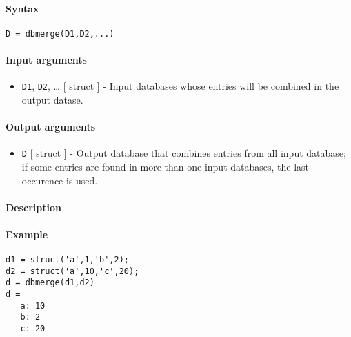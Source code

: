 


	\paragraph{Syntax}\label{syntax}

\begin{verbatim}
D = dbmerge(D1,D2,...)
\end{verbatim}

\paragraph{Input arguments}\label{input-arguments}

\begin{itemize}
\itemsep1pt\parskip0pt
\item
  \texttt{D1}, \texttt{D2}, \ldots{} {[} struct {]} - Input databases
  whose entries will be combined in the output datase.
\end{itemize}

\paragraph{Output arguments}\label{output-arguments}

\begin{itemize}
\itemsep1pt\parskip0pt
\item
  \texttt{D} {[} struct {]} - Output database that combines entries from
  all input database; if some entries are found in more than one input
  databases, the last occurence is used.
\end{itemize}

\paragraph{Description}\label{description}

\paragraph{Example}\label{example}

\begin{verbatim}
d1 = struct('a',1,'b',2);
d2 = struct('a',10,'c',20);
d = dbmerge(d1,d2)
d =
   a: 10
   b: 2
   c: 20
\end{verbatim}



